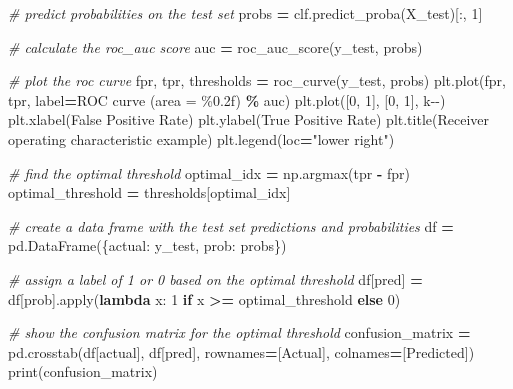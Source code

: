 \documentclass[
]{article}
\newenvironment{Shaded}{\begin{snugshade}}{\end{snugshade}}
\newcommand{\BuiltInTok}[1]{#1}
\newcommand{\CommentTok}[1]{\textcolor[rgb]{0.56,0.35,0.01}{\textit{#1}}}
\newcommand{\ControlFlowTok}[1]{\textcolor[rgb]{0.13,0.29,0.53}{\textbf{#1}}}
\newcommand{\DecValTok}[1]{\textcolor[rgb]{0.00,0.00,0.81}{#1}}
\newcommand{\KeywordTok}[1]{\textcolor[rgb]{0.13,0.29,0.53}{\textbf{#1}}}
\newcommand{\NormalTok}[1]{#1}
\newcommand{\OperatorTok}[1]{\textcolor[rgb]{0.81,0.36,0.00}{\textbf{#1}}}
\newcommand{\SpecialCharTok}[1]{\textcolor[rgb]{0.00,0.00,0.00}{#1}}
\newcommand{\StringTok}[1]{\textcolor[rgb]{0.31,0.60,0.02}{#1}}
\begin{document}
\begin{Shaded}
\begin{Highlighting}[]
\CommentTok{\# predict probabilities on the test set}
\NormalTok{probs }\OperatorTok{=}\NormalTok{ clf.predict\_proba(X\_test)[:, }\DecValTok{1}\NormalTok{]}

\CommentTok{\# calculate the roc\_auc score}
\NormalTok{auc }\OperatorTok{=}\NormalTok{ roc\_auc\_score(y\_test, probs)}

\CommentTok{\# plot the roc curve}
\NormalTok{fpr, tpr, thresholds }\OperatorTok{=}\NormalTok{ roc\_curve(y\_test, probs)}
\NormalTok{plt.plot(fpr, tpr, label}\OperatorTok{=}\StringTok{\textquotesingle{}ROC curve (area = }\SpecialCharTok{\%0.2f}\StringTok{)\textquotesingle{}} \OperatorTok{\%}\NormalTok{ auc)}
\NormalTok{plt.plot([}\DecValTok{0}\NormalTok{, }\DecValTok{1}\NormalTok{], [}\DecValTok{0}\NormalTok{, }\DecValTok{1}\NormalTok{], }\StringTok{\textquotesingle{}k{-}{-}\textquotesingle{}}\NormalTok{)}
\NormalTok{plt.xlabel(}\StringTok{\textquotesingle{}False Positive Rate\textquotesingle{}}\NormalTok{)}
\NormalTok{plt.ylabel(}\StringTok{\textquotesingle{}True Positive Rate\textquotesingle{}}\NormalTok{)}
\NormalTok{plt.title(}\StringTok{\textquotesingle{}Receiver operating characteristic example\textquotesingle{}}\NormalTok{)}
\NormalTok{plt.legend(loc}\OperatorTok{=}\StringTok{"lower right"}\NormalTok{)}

\CommentTok{\# find the optimal threshold}
\NormalTok{optimal\_idx }\OperatorTok{=}\NormalTok{ np.argmax(tpr }\OperatorTok{{-}}\NormalTok{ fpr)}
\NormalTok{optimal\_threshold }\OperatorTok{=}\NormalTok{ thresholds[optimal\_idx]}

\CommentTok{\# create a data frame with the test set predictions and probabilities}
\NormalTok{df }\OperatorTok{=}\NormalTok{ pd.DataFrame(\{}\StringTok{\textquotesingle{}actual\textquotesingle{}}\NormalTok{: y\_test, }\StringTok{\textquotesingle{}prob\textquotesingle{}}\NormalTok{: probs\})}

\CommentTok{\# assign a label of 1 or 0 based on the optimal threshold}
\NormalTok{df[}\StringTok{\textquotesingle{}pred\textquotesingle{}}\NormalTok{] }\OperatorTok{=}\NormalTok{ df[}\StringTok{\textquotesingle{}prob\textquotesingle{}}\NormalTok{].}\BuiltInTok{apply}\NormalTok{(}\KeywordTok{lambda}\NormalTok{ x: }\DecValTok{1} \ControlFlowTok{if}\NormalTok{ x }\OperatorTok{\textgreater{}=}\NormalTok{ optimal\_threshold }\ControlFlowTok{else} \DecValTok{0}\NormalTok{)}

\CommentTok{\# show the confusion matrix for the optimal threshold}
\NormalTok{confusion\_matrix }\OperatorTok{=}\NormalTok{ pd.crosstab(df[}\StringTok{\textquotesingle{}actual\textquotesingle{}}\NormalTok{], df[}\StringTok{\textquotesingle{}pred\textquotesingle{}}\NormalTok{], rownames}\OperatorTok{=}\NormalTok{[}\StringTok{\textquotesingle{}Actual\textquotesingle{}}\NormalTok{], colnames}\OperatorTok{=}\NormalTok{[}\StringTok{\textquotesingle{}Predicted\textquotesingle{}}\NormalTok{])}
\BuiltInTok{print}\NormalTok{(confusion\_matrix)}
\end{Highlighting}
\end{Shaded}
\end{document}
